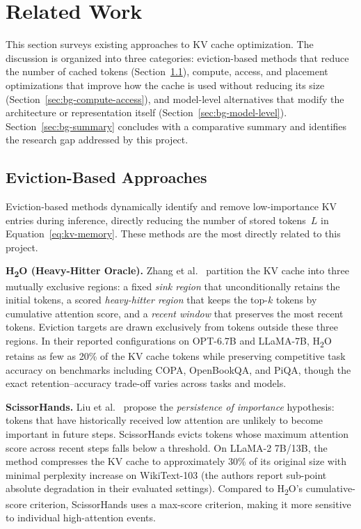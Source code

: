 \documentclass[
english,                 %
bibtex,                  %
]{kththesis}
\numberwithin{listing}{chapter}
\begin{document}
\section{Related Work}
\label{sec:bg-related-work}

This section surveys existing approaches to \gls{KV} cache optimization. The discussion is organized into three categories: eviction-based methods that reduce the number of cached tokens (Section~\ref{sec:bg-eviction}), compute, access, and placement optimizations that improve how the cache is used without reducing its size (Section~\ref{sec:bg-compute-access}), and model-level alternatives that modify the architecture or representation itself (Section~\ref{sec:bg-model-level}). Section~\ref{sec:bg-summary} concludes with a comparative summary and identifies the research gap addressed by this project.

\subsection{Eviction-Based Approaches}
\label{sec:bg-eviction}

Eviction-based methods dynamically identify and remove low-importance \gls{KV} entries during inference, directly reducing the number of stored tokens~$L$ in Equation~\ref{eq:kv-memory}. These methods are the most directly related to this project.

\textbf{H\textsubscript{2}O (Heavy-Hitter Oracle).} Zhang et al.~\cite{zhang2024h2o} partition the \gls{KV} cache into three mutually exclusive regions: a fixed \textit{sink region} that unconditionally retains the initial tokens, a scored \textit{heavy-hitter region} that keeps the top-$k$ tokens by cumulative attention score, and a \textit{recent window} that preserves the most recent tokens. Eviction targets are drawn exclusively from tokens outside these three regions. In their reported configurations on OPT-6.7B and LLaMA-7B, H\textsubscript{2}O retains as few as 20\% of the \gls{KV} cache tokens while preserving competitive task accuracy on benchmarks including COPA, OpenBookQA, and PiQA, though the exact retention--accuracy trade-off varies across tasks and models.

\textbf{ScissorHands.} Liu et al.~\cite{liu2024scissorhands} propose the \textit{persistence of importance} hypothesis: tokens that have historically received low attention are unlikely to become important in future steps. ScissorHands evicts tokens whose maximum attention score across recent steps falls below a threshold. On LLaMA-2 7B/13B, the method compresses the \gls{KV} cache to approximately 30\% of its original size with minimal perplexity increase on WikiText-103 (the authors report sub-point absolute degradation in their evaluated settings). Compared to H\textsubscript{2}O's cumulative-score criterion, ScissorHands uses a max-score criterion, making it more sensitive to individual high-attention events.
\end{document}
